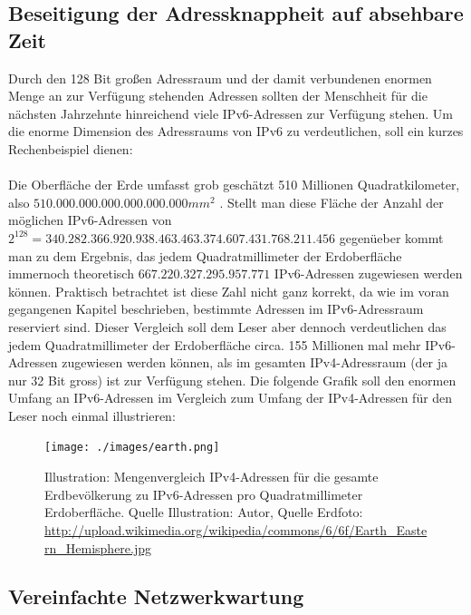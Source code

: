 \documentclass[a4paper,12pt]{scrartcl}
\begin{document}
\subsection{Beseitigung der Adressknappheit auf absehbare Zeit}
Durch den 128 Bit gro{\ss}en Adressraum und der damit verbundenen enormen Menge an zur Verf\"ugung stehenden Adressen sollten der Menschheit f\"ur die n\"achsten Jahrzehnte hinreichend viele IPv6-Adressen zur Verfügung stehen.  Um die enorme Dimension des Adressraums von IPv6 zu verdeutlichen, soll ein kurzes Rechenbeispiel dienen:\\
\\
Die Oberfläche der Erde umfasst grob geschätzt 510 Millionen Quadratkilometer, also $510.000.000.000.000.000.000 mm^2$ . Stellt man diese Fl\"ache der Anzahl der m\"oglichen IPv6-Adressen von $2^{128} = 340.282.366.920.938.463.463.374.607.431.768.211.456$ gegen\"ueber kommt man zu dem Ergebnis, das jedem Quadratmillimeter der Erdoberfl\"ache immernoch theoretisch $667.220.327.295.957.771 $ IPv6-Adressen zugewiesen werden k\"onnen. Praktisch betrachtet ist diese Zahl nicht ganz korrekt, da wie im voran gegangenen Kapitel beschrieben, bestimmte Adressen im IPv6-Adressraum reserviert sind. Dieser Vergleich soll dem Leser aber dennoch verdeutlichen das jedem Quadratmillimeter der Erdoberfl\"ache circa. 155 Millionen mal mehr IPv6-Adressen zugewiesen werden k\"onnen, als im gesamten IPv4-Adressraum (der ja nur 32 Bit gross) ist zur Verf\"ugung stehen. Die folgende Grafik soll den enormen Umfang an IPv6-Adressen im Vergleich zum Umfang der IPv4-Adressen f\"ur den Leser noch einmal illustrieren:

\clearpage

\begin{figure}[htb]
\begin{center}
 \texttt{[image: ./images/earth.png]}
 \end{center}
\caption[Illustration: Mengenvergleich IPv4-Adressen f\"ur die gesamte Erdbev\"olkerung zu IPv6-Adressen pro Quadratmillimeter Erdoberfl\"ache. Quelle Illustration: Autor, Quelle Erdfoto: \url{http://upload.wikimedia.org/wikipedia/commons/6/6f/Earth_Eastern_Hemisphere.jpg}]{\label{earth}Illustration: Mengenvergleich IPv4-Adressen f\"ur die gesamte Erdbev\"olkerung zu IPv6-Adressen pro Quadratmillimeter Erdoberfl\"ache.  Quelle Illustration: Autor, Quelle Erdfoto: \url{http://upload.wikimedia.org/wikipedia/commons/6/6f/Earth_Eastern_Hemisphere.jpg}}
\end{figure}

\subsection{Vereinfachte Netzwerkwartung}
\end{document}
